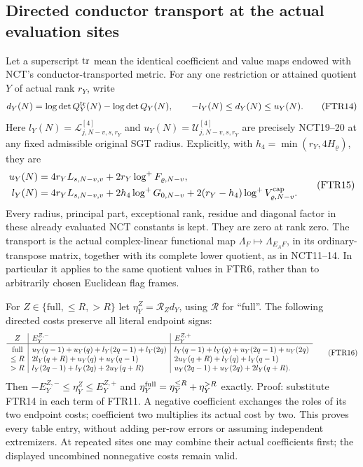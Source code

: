 \documentclass[11pt,a4paper]{article}
\begin{document}
\subsection{Directed conductor transport at the actual evaluation sites}
Let a superscript ${\rm tr}$ mean the identical coefficient and value
maps endowed with NCT's conductor-transported metric. For any one
restriction or attained quotient $Y$ of actual rank $r_Y$, write
\[
 d_Y(N)=\log\det Q_Y^{\rm tr}(N)-\log\det Q_Y(N),\qquad
 -l_Y(N)\le d_Y(N)\le u_Y(N).                            \tag{FTR14}
\]
Here $l_Y(N)=\mathcal L^{[4]}_{j,N-v,s,r_Y}$ and
$u_Y(N)=\mathcal U^{[4]}_{j,N-v,s,r_Y}$ are precisely
NCT19--20 at any fixed admissible original SGT radius. Explicitly,
with $h_4=\min(r_Y,4H_\varrho)$, they are
\[
\begin{aligned}
 u_Y(N)&=4r_YL_{s,N-v,v}
                 +2r_Y\log^+F_{\varrho,N-v},\\
 l_Y(N)&=4r_YL_{s,N-v,v}+2h_4\log^+G_{0,N-v}
                 +2(r_Y-h_4)\log^+V_{\varrho,N-v}^{\rm cap}.
\end{aligned}                                                   \tag{FTR15}
\]
Every radius, principal part, exceptional rank, residue and
diagonal factor in these already evaluated NCT constants is kept.
They are zero at rank zero. The transport is the actual complex-linear
functional map $\Lambda_F\mapsto\Lambda_{E_AF}$, in its ordinary-
transpose matrix, together with its complete lower quotient, as in
NCT11--14. In particular it applies to the same quotient values in
FTR6, rather than to arbitrarily chosen Euclidean flag frames.

For $Z\in\{\mathrm{full},\le R,>R\}$ let
$\eta_Y^Z=\mathcal R_Zd_Y$, using $\mathcal R$ for ``full''.
The following directed costs preserve all literal endpoint signs:
\[
\begin{array}{c|l|l}
 Z&E_Y^{Z,-}&E_Y^{Z,+}\\\hline
 \mathrm{full}
 &u_Y(q-1)+u_Y(q)+l_Y(2q-1)+l_Y(2q)
 &l_Y(q-1)+l_Y(q)+u_Y(2q-1)+u_Y(2q)\rule{0pt}{2.5ex}\\
 \le R&2l_Y(q+R)+u_Y(q)+u_Y(q-1)
      &2u_Y(q+R)+l_Y(q)+l_Y(q-1)\\
 >R&l_Y(2q-1)+l_Y(2q)+2u_Y(q+R)
    &u_Y(2q-1)+u_Y(2q)+2l_Y(q+R).
\end{array}                                                     \tag{FTR16}
\]
Then $-E_Y^{Z,-}\le\eta_Y^Z\le E_Y^{Z,+}$ and
$\eta_Y^{\rm full}=\eta_Y^{\le R}+\eta_Y^{>R}$ exactly.
Proof: substitute FTR14 in each term of FTR11. A negative coefficient
exchanges the roles of its two endpoint costs; coefficient two
multiplies its actual cost by two. This proves every table entry,
without adding per-row errors or assuming independent extremizers.
At repeated sites one may combine their actual coefficients first;
the displayed uncombined nonnegative costs remain valid.
\end{document}
